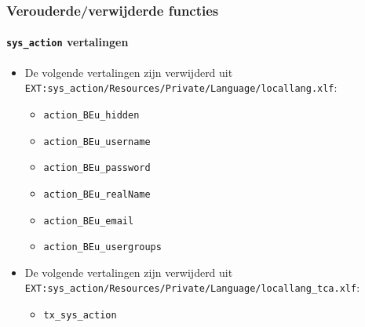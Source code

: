 \begin{frame}[fragile]
	\frametitle{Verouderde/verwijderde functies}
	\framesubtitle{\texttt{sys\_action} vertalingen}

	\begin{itemize}
		\item De volgende vertalingen zijn verwijderd uit
			\smaller\texttt{EXT:sys\_action/Resources/Private/Language/locallang.xlf}:\normalsize

		\begin{itemize}
			\item \texttt{action\_BEu\_hidden}
			\item \texttt{action\_BEu\_username}
			\item \texttt{action\_BEu\_password}
			\item \texttt{action\_BEu\_realName}
			\item \texttt{action\_BEu\_email}
			\item \texttt{action\_BEu\_usergroups}
		\end{itemize}

		\item De volgende vertalingen zijn verwijderd uit
			\smaller\texttt{EXT:sys\_action/Resources/Private/Language/locallang\_tca.xlf}:\normalsize

		\begin{itemize}
			\item \texttt{tx\_sys\_action}
		\end{itemize}

	\end{itemize}

\end{frame}



